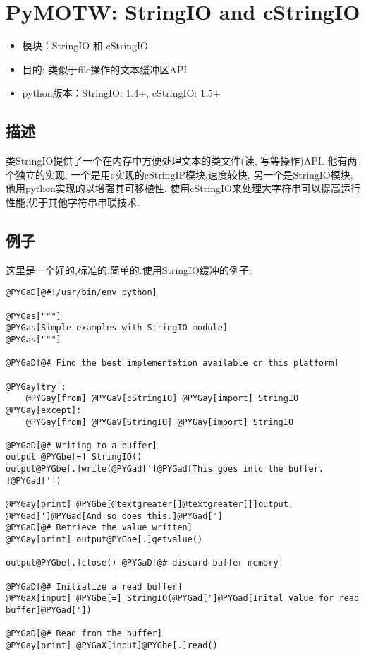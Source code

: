 \documentclass[a4paper,10pt,english]{manual}
\begin{document}
\chapter{PyMOTW: StringIO and cStringIO}
\begin{itemize}
\item {} 
模块：StringIO 和 cStringIO

\item {} 
目的: 类似于file操作的文本缓冲区API

\item {} 
python版本：StringIO: 1.4+, cStringIO: 1.5+

\end{itemize}


\section{描述}

类StringIO提供了一个在内存中方便处理文本的类文件(读, 写等操作)API. 他有两个独立的实现, 一个是用c实现的cStringIP模块,速度较快, 另一个是StringIO模块,他用python实现的以增强其可移植性. 使用cStringIO来处理大字符串可以提高运行性能,优于其他字符串串联技术.


\section{例子}

这里是一个好的,标准的,简单的.使用StringIO缓冲的例子:

\begin{Verbatim}[commandchars=@\[\]]
@PYGaD[@#!/usr/bin/env python]

@PYGas["""]
@PYGas[Simple examples with StringIO module]
@PYGas["""]

@PYGaD[@# Find the best implementation available on this platform]

@PYGay[try]:
    @PYGay[from] @PYGaV[cStringIO] @PYGay[import] StringIO
@PYGay[except]:
    @PYGay[from] @PYGaV[StringIO] @PYGay[import] StringIO

@PYGaD[@# Writing to a buffer]
output @PYGbe[=] StringIO()
output@PYGbe[.]write(@PYGad[']@PYGad[This goes into the buffer. ]@PYGad['])

@PYGay[print] @PYGbe[@textgreater[]@textgreater[]]output, @PYGad[']@PYGad[And so does this.]@PYGad[']
@PYGaD[@# Retrieve the value written]
@PYGay[print] output@PYGbe[.]getvalue()

output@PYGbe[.]close() @PYGaD[@# discard buffer memory]

@PYGaD[@# Initialize a read buffer]
@PYGaX[input] @PYGbe[=] StringIO(@PYGad[']@PYGad[Inital value for read buffer]@PYGad['])

@PYGaD[@# Read from the buffer]
@PYGay[print] @PYGaX[input]@PYGbe[.]read()
\end{Verbatim}
\end{document}
